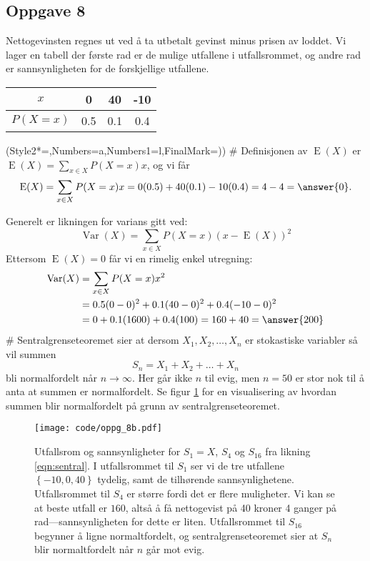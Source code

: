 \subsection*{Oppgave 8}
Nettogevinsten regnes ut ved å ta utbetalt gevinst minus prisen av loddet.
Vi lager en tabell der første rad er de mulige utfallene i utfallsrommet, og andre rad er sannsynligheten for de forskjellige utfallene.
\begin{center}
	\begin{tabular}{|c|c|c|c|} \hline
		$x$ & 0 & 40 & -10 \\ \hline
		$P(X = x)$ & 0.5 & 0.1 & 0.4  \\ \hline
	\end{tabular}
\end{center}
\begin{easylist}[enumerate]
\ListProperties(Style2*=,Numbers=a,Numbers1=l,FinalMark={)})
# Definisjonen av $\operatorname{E}(X)$ er $\operatorname{E}(X) = \sum_{x \in X}P(X = x)x$, og vi får
\begin{equation*}
\operatorname{E}(X) = \sum_{x \in X}P(X = x)x =  0 (0.5) + 40 (0.1) -10 (0.4) = 4 - 4 = \answer{0}.
\end{equation*}

Generelt er likningen for varians gitt ved:
\begin{equation*}
\operatorname{Var}(X) = \sum_{x \in X}P(X = x)(x - \operatorname{E}(X))^2 
\end{equation*}
Ettersom $\operatorname{E}(X) = 0$ får vi en rimelig enkel utregning:
\begin{align*}
\operatorname{Var}(X) &= \sum_{x \in X}P(X = x)x^2 \\
&= 0.5 (0 - 0)^2 + 0.1 (40 - 0)^2 + 0.4 (-10 - 0)^2 \\
&= 0 + 0.1 (1600) + 0.4 (100) = 160 + 40 = \answer{200}
\end{align*}
# Sentralgrenseteoremet sier at dersom $X_1, X_2, \dots, X_n$ er stokastiske variabler så vil summen
\begin{equation}
	\label{eqn:sentral}
	S_n = X_1 + X_2 + \dots + X_n
\end{equation}
bli normalfordelt når $n \to \infty$. 
Her går ikke $n$ til evig, men $n = 50$ er stor nok til å anta at summen er normalfordelt.
Se figur \ref{fig:oppg_8b} for en visualisering av hvordan summen blir normalfordelt på grunn av sentralgrenseteoremet.

\begin{figure}[ht!]
\centering
\texttt{[image: code/oppg\_8b.pdf]}
\caption{Utfallsrom og sannsynligheter for $S_1 = X$, $S_4$ og $S_{16}$ fra likning \eqref{eqn:sentral}.
	I utfallsrommet til $S_1$ ser vi de tre utfallene $\left\{-10, 0, 40\right\}$ tydelig, samt de tilhørende sannsynlighetene. 
	Utfallsrommet til $S_4$ er større fordi det er flere muligheter. Vi kan se at beste utfall er $160$, altså å få nettogevist på 40 kroner 4 ganger på rad---sannsynligheten for dette er liten.
	Utfallsrommet til $S_{16}$ begynner å ligne normaltfordelt, og sentralgrenseteoremet sier at $S_n$ blir normaltfordelt når $n$ går mot evig.}
\label{fig:oppg_8b}
\end{figure}




\end{easylist}
